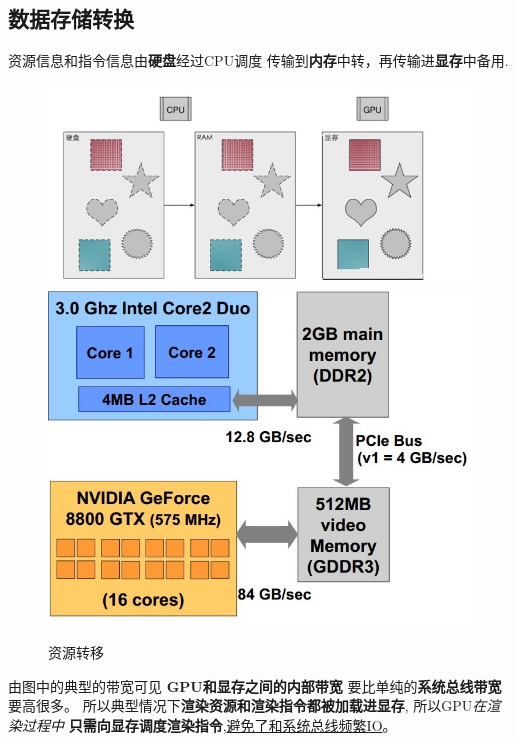 \documentclass[UTF8,a4paper,12pt]{ctexbook}
\begin{document}
		\subsection{数据存储转换}
		 	资源信息和指令信息由\textbf{硬盘}经过CPU调度 传输到\textbf{内存}中转，再传输进\textbf{显存}中备用.
		 		\begin{figure}[H]
		 			\centering
		 			\includegraphics[scale=1]{transfer}
		 			\includegraphics[scale=0.9]{transfer2}
		 			\caption{资源转移}
		 		\end{figure}
		
			由图中的典型的带宽可见 \textbf{GPU和显存之间的内部带宽} 要比单纯的\textbf{系统总线带宽}要高很多。
			所以典型情况下\textbf{渲染资源和渲染指令都被加载进显存}, 所以GPU\textit{在渲染过程中} \textbf{只需向显存调度渲染指令},\underline{避免了和系统总线频繁IO}。
				
\end{document}
